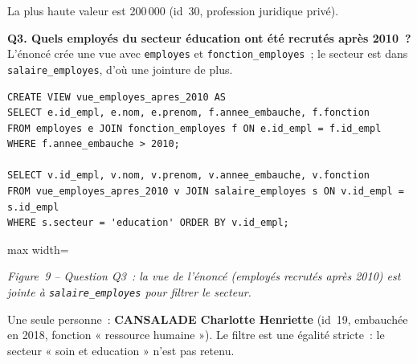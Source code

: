 \noindent La plus haute valeur est 200\,000 (id~30, profession juridique privé).

\medskip
\noindent \textbf{Q3. Quels employés du secteur éducation ont été recrutés après 2010~?} L'énoncé crée une vue avec \texttt{employes} et \texttt{fonction\_employes}~; le secteur est dans \texttt{salaire\_employes}, d'où une jointure de plus.

\begin{verbatim}
CREATE VIEW vue_employes_apres_2010 AS
SELECT e.id_empl, e.nom, e.prenom, f.annee_embauche, f.fonction
FROM employes e JOIN fonction_employes f ON e.id_empl = f.id_empl
WHERE f.annee_embauche > 2010;

SELECT v.id_empl, v.nom, v.prenom, v.annee_embauche, v.fonction
FROM vue_employes_apres_2010 v JOIN salaire_employes s ON v.id_empl = s.id_empl
WHERE s.secteur = 'education' ORDER BY v.id_empl;
\end{verbatim}

\begin{center}
\begin{adjustbox}{max width=\linewidth}
\end{adjustbox}\par\nobreak\smallskip
\small\textit{Figure~9 -- Question Q3~: la vue de l'énoncé (employés recrutés après 2010) est jointe à \texttt{salaire\_employes} pour filtrer le secteur.}
\end{center}

\noindent Une seule personne~: \textbf{CANSALADE Charlotte Henriette} (id~19, embauchée en 2018, fonction « ressource humaine »).
Le filtre est une égalité stricte~: le secteur « soin et education » n'est pas retenu.

